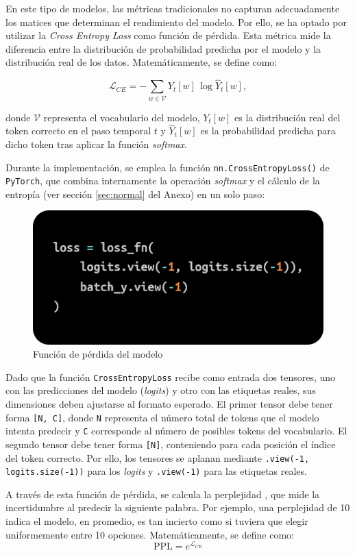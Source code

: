 \documentclass[11pt]{book}
\begin{document}
En este tipo de modelos, las métricas tradicionales no capturan adecuadamente los matices que determinan el rendimiento del modelo. Por ello, se ha optado por utilizar la \textit{Cross Entropy Loss} como función de pérdida. Esta métrica mide la diferencia entre la distribución de probabilidad predicha por el modelo y la distribución real de los datos. 
Matemáticamente, se define como:

\[
\mathcal{L}_{CE} = - \sum_{w \in \mathcal{V}} Y_t[w] \, \log \hat{Y}_t[w],
\]

donde $\mathcal{V}$ representa el vocabulario del modelo, $Y_t[w]$ es la distribución real del token correcto en el paso temporal $t$ y $\hat{Y}_t[w]$ es la probabilidad predicha para dicho token tras aplicar la función \textit{softmax}.

Durante la implementación, se emplea la función \texttt{nn.CrossEntropyLoss()} de \texttt{PyTorch}, que combina internamente la operación \textit{softmax} y el cálculo de la entropía (ver sección \ref{sec:normal} del Anexo) en un solo paso:

\begin{figure}[h]
    \centering
    \includegraphics[width=0.5\linewidth]{img/cross_entropy.png}
    \caption{Función de pérdida del modelo \parencite{geeksforgeeks_crossentropy}}
    \label{fig:placeholder20}
\end{figure}

Dado que la función \texttt{CrossEntropyLoss} recibe como entrada dos tensores, uno con las predicciones del modelo (\textit{logits}) y otro con las etiquetas reales, sus dimensiones deben ajustarse al formato esperado. El primer tensor debe tener forma \texttt{[N, C]}, donde \texttt{N} representa el número total de tokens que el modelo intenta predecir y \texttt{C} corresponde al número de posibles tokens del vocabulario. El segundo tensor debe tener forma \texttt{[N]}, conteniendo para cada posición el índice del token correcto. Por ello, los tensores se aplanan mediante \texttt{.view(-1, logits.size(-1))} para los \textit{logits} y \texttt{.view(-1)} para las etiquetas reales.

A través de esta función de pérdida, se calcula la perplejidad \parencite{keerthanams2025evaluating}, que mide la incertidumbre al predecir la siguiente palabra. Por ejemplo, una perplejidad de 10 indica el modelo, en promedio, es tan incierto como si tuviera que elegir uniformemente entre 10 opciones. Matemáticamente, se define como:
\[
\text{PPL} = e^{\mathcal{L}_{CE}}
\]
\end{document}
